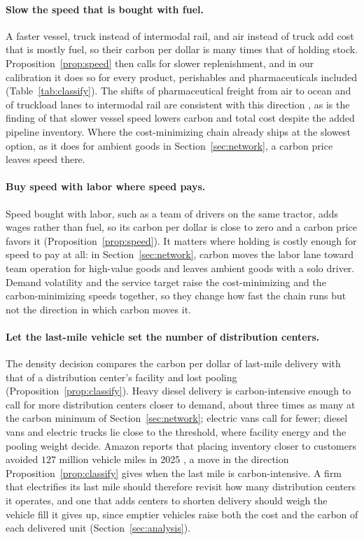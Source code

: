 \documentclass[11pt]{article}
\theoremstyle{definition}
\theoremstyle{remark}
\theoremstyle{plain}
\begin{document}
\paragraph{Slow the speed that is bought with fuel.} A faster vessel, truck instead of intermodal rail, and air
instead of truck add cost that is mostly fuel, so their carbon per dollar is many times that of holding stock.
Proposition~\ref{prop:speed} then calls for slower replenishment, and in our calibration it does so for every
product, perishables and pharmaceuticals included (Table~\ref{tab:classify}). The shifts of pharmaceutical
freight from air to ocean and of truckload lanes to intermodal rail are consistent with this direction
\citep{pharmcommerce2023astrazeneca, freightwaves2026intermodal}, as is the finding of \citet{maloni2013slow}
that slower vessel speed lowers carbon and total cost despite the added pipeline inventory. Where the cost-minimizing chain already ships at
the slowest option, as it does for ambient goods in Section~\ref{sec:network}, a carbon price leaves speed there.

\paragraph{Buy speed with labor where speed pays.} Speed bought with labor, such as a team of drivers on the same
tractor, adds wages rather than fuel, so its carbon per dollar is close to zero and a carbon price favors it
(Proposition~\ref{prop:speed}). It matters where holding is costly enough for speed to pay at all: in
Section~\ref{sec:network}, carbon moves the labor lane toward team operation for high-value goods and leaves
ambient goods with a solo driver. Demand volatility and the service target raise the cost-minimizing and the
carbon-minimizing speeds together, so they change how fast the chain runs but not the direction in which carbon
moves it.

\paragraph{Let the last-mile vehicle set the number of distribution centers.} The density decision compares the
carbon per dollar of last-mile delivery with that of a distribution center's facility and lost pooling
(Proposition~\ref{prop:classify}). Heavy diesel delivery is carbon-intensive enough to call for more
distribution centers closer to demand, about three times as many at the carbon minimum of
Section~\ref{sec:network}; electric vans call for fewer; diesel vans and electric trucks lie close to the
threshold, where facility energy and the pooling weight decide. Amazon reports that placing inventory closer to
customers avoided $127$ million vehicle miles in 2025 \citep{amazon2025sustainability}, a move in the direction
Proposition~\ref{prop:classify} gives when the last mile is carbon-intensive. A firm that electrifies its last mile should
therefore revisit how many distribution centers it operates, and one that adds centers to shorten delivery
should weigh the vehicle fill it gives up, since emptier vehicles raise both the cost and the carbon of each
delivered unit (Section~\ref{sec:analysis}).
\end{document}
